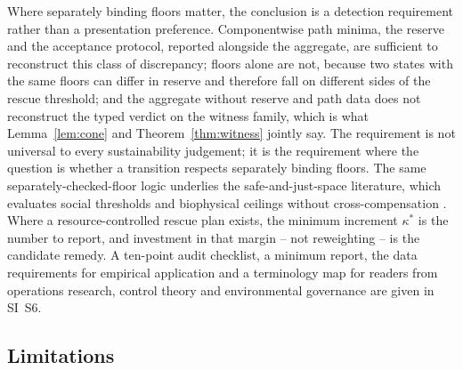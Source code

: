 \documentclass[preprint,11pt,authoryear]{elsarticle}
\theoremstyle{definition}
\theoremstyle{remark}
\begin{document}
Where separately binding floors matter, the conclusion is a detection requirement rather than a presentation preference. Componentwise path minima, the reserve and the acceptance protocol, reported alongside the aggregate, are sufficient to reconstruct this class of discrepancy; floors alone are not, because two states with the same floors can differ in reserve and therefore fall on different sides of the rescue threshold; and the aggregate without reserve and path data does not reconstruct the typed verdict on the witness family, which is what Lemma~\ref{lem:cone} and Theorem~\ref{thm:witness} jointly say. The requirement is not universal to every sustainability judgement; it is the requirement where the question is whether a transition respects separately binding floors. The same separately-checked-floor logic underlies the safe-and-just-space literature, which evaluates social thresholds and biophysical ceilings without cross-compensation \citep{Raworth2012,ONeill2018,Fanning2022}. Where a resource-controlled rescue plan exists, the minimum increment $\kappa^*$ is the number to report, and investment in that margin -- not reweighting -- is the candidate remedy. A ten-point audit checklist, a minimum report, the data requirements for empirical application and a terminology map for readers from operations research, control theory and environmental governance are given in SI~S6.

\subsection{Limitations}\label{sec:limitations}
\end{document}
